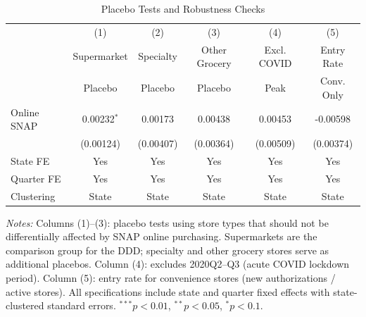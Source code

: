 \begin{table}[t]
\centering
\caption{Placebo Tests and Robustness Checks}
\label{tab:robust}
\begin{tabular}{lccccc}
\toprule
 & (1) & (2) & (3) & (4) & (5) \\
 & Supermarket & Specialty & Other Grocery & Excl. COVID & Entry Rate \\
 & Placebo & Placebo & Placebo & Peak & Conv. Only \\
\midrule
Online SNAP & 0.00232$^{*}$ & 0.00173 & 0.00438 & 0.00453 & -0.00598 \\
 & (0.00124) & (0.00407) & (0.00364) & (0.00509) & (0.00374) \\
\midrule
State FE & Yes & Yes & Yes & Yes & Yes \\
Quarter FE & Yes & Yes & Yes & Yes & Yes \\
Clustering & State & State & State & State & State \\
\bottomrule
\end{tabular}
\begin{tablenotes}
\item \textit{Notes:} Columns (1)--(3): placebo tests using store types that should not be differentially affected by SNAP online purchasing. Supermarkets are the comparison group for the DDD; specialty and other grocery stores serve as additional placebos. Column (4): excludes 2020Q2--Q3 (acute COVID lockdown period). Column (5): entry rate for convenience stores (new authorizations / active stores). All specifications include state and quarter fixed effects with state-clustered standard errors. $^{***}p<0.01$, $^{**}p<0.05$, $^{*}p<0.1$.
\end{tablenotes}
\end{table}

